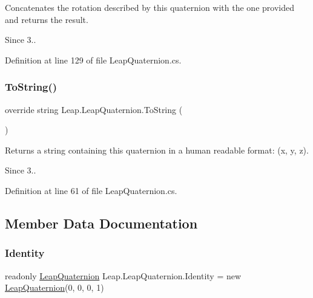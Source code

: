 Concatenates the rotation described by this quaternion with the one provided and returns the result. 

\begin{DoxySince}{Since}
3.. 
\end{DoxySince}


Definition at line 129 of file Leap\+Quaternion.\+cs.

\mbox{\label{struct_leap_1_1_leap_quaternion_af4a1e8e78b01fc8c0d28a9dc121a5a8f}} 
\subsubsection{\texorpdfstring{ToString()}{ToString()}}
{\footnotesize\ttfamily override string Leap.\+Leap\+Quaternion.\+To\+String (\begin{DoxyParamCaption}{ }\end{DoxyParamCaption})}



Returns a string containing this quaternion in a human readable format\+: (x, y, z). 

\begin{DoxySince}{Since}
3.. 
\end{DoxySince}


Definition at line 61 of file Leap\+Quaternion.\+cs.



\subsection{Member Data Documentation}
\mbox{\label{struct_leap_1_1_leap_quaternion_aa69693c6f2fd5545034b9c1c0af286b6}} 
\subsubsection{\texorpdfstring{Identity}{Identity}}
{\footnotesize\ttfamily readonly \mbox{\hyperlink{struct_leap_1_1_leap_quaternion}{Leap\+Quaternion}} Leap.\+Leap\+Quaternion.\+Identity = new \mbox{\hyperlink{struct_leap_1_1_leap_quaternion}{Leap\+Quaternion}}(0, 0, 0, 1)\hspace{0.3cm}{\ttfamily [static]}}



